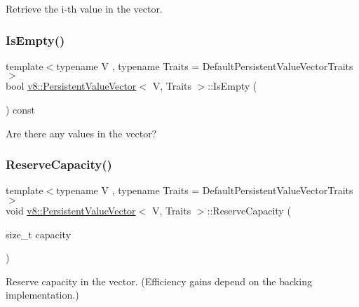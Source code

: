 Retrieve the i-\/th value in the vector. \mbox{\label{classv8_1_1PersistentValueVector_aa45dd4d1ee94a2c199a28a0bb2e432f1}} 
\subsubsection{\texorpdfstring{Is\+Empty()}{IsEmpty()}}
{\footnotesize\ttfamily template$<$typename V , typename Traits  = Default\+Persistent\+Value\+Vector\+Traits$>$ \\
bool \mbox{\hyperlink{classv8_1_1PersistentValueVector}{v8\+::\+Persistent\+Value\+Vector}}$<$ V, Traits $>$\+::Is\+Empty (\begin{DoxyParamCaption}{ }\end{DoxyParamCaption}) const\hspace{0.3cm}{\ttfamily [inline]}}

Are there any values in the vector? \mbox{\label{classv8_1_1PersistentValueVector_ad4cccfee3a275986578276efe0c78510}} 
\subsubsection{\texorpdfstring{Reserve\+Capacity()}{ReserveCapacity()}}
{\footnotesize\ttfamily template$<$typename V , typename Traits  = Default\+Persistent\+Value\+Vector\+Traits$>$ \\
void \mbox{\hyperlink{classv8_1_1PersistentValueVector}{v8\+::\+Persistent\+Value\+Vector}}$<$ V, Traits $>$\+::Reserve\+Capacity (\begin{DoxyParamCaption}\item[{size\+\_\+t}]{capacity }\end{DoxyParamCaption})\hspace{0.3cm}{\ttfamily [inline]}}

Reserve capacity in the vector. (Efficiency gains depend on the backing implementation.) \mbox{\label{classv8_1_1PersistentValueVector_adf4e13701de97acc753ca294c66b9f35}} 
